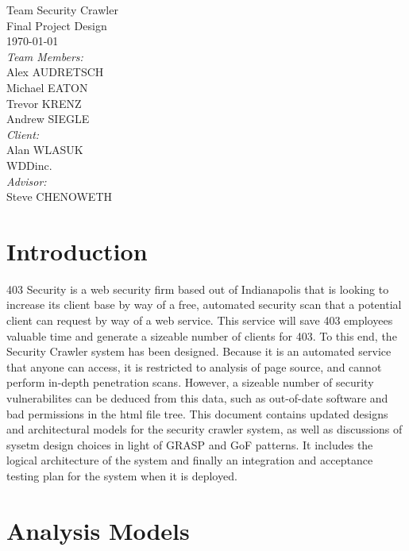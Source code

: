 \documentclass{article}
\begin{document}
\fancyhf{}
\rhead{\today}

\begin{titlepage}
\begin{center}
{\huge Team Security Crawler}\\[2cm]
{\Large Final Project Design}\\[2cm]
{\large \today}\\[2cm]
\emph{Team Members:}\\
Alex \uppercase{Audretsch}\\
Michael \uppercase{Eaton}\\
Trevor \uppercase{Krenz}\\
Andrew \uppercase{Siegle}\\[1cm]
\emph{Client:}\\
Alan WLASUK\\
WDDinc.\\[1cm]
\emph{Advisor:}\\
Steve CHENOWETH

\end{center}
\end{titlepage}
\tableofcontents
\newpage

\section{Introduction}
403 Security is a web security firm based out of Indianapolis that is looking to increase its client base by way of a free, automated security scan that a potential client can request by way of a web service.  This service will save 403 employees valuable time and generate a sizeable number of clients for 403.
To this end, the Security Crawler system has been designed.  Because it is an automated service that anyone can access, it is restricted to analysis of page source, and cannot perform in-depth penetration scans.  However, a sizeable number of security vulnerabilites can be deduced from this data, such as out-of-date software and bad permissions in the html file tree.
This document contains updated designs and architectural models for the security crawler system, as well as discussions of sysetm design choices in light of GRASP and GoF patterns.  It includes the logical architecture of the system and finally an integration and acceptance testing plan for the system when it is deployed.

\newpage
\section{Analysis Models}
\newpage
\end{document}
